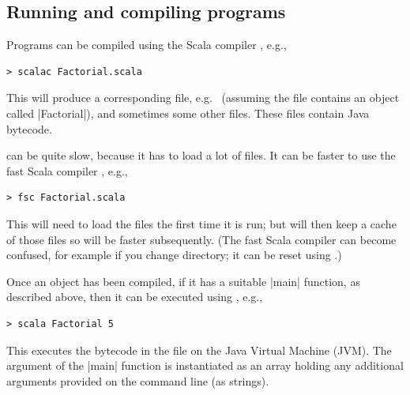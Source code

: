 \subsection{Running and compiling programs}


Programs can be compiled using the Scala compiler
, e.g., {\codecolour
\begin{verbatim}
> scalac Factorial.scala
\end{verbatim}
}%
\noindent This will produce a corresponding  file,
e.g.~ (assuming the file contains an object called
|Factorial|), and sometimes some other  files.  These files
contain Java bytecode.

 can be quite slow, because it has to load a lot of files.  It
can be faster to use the fast Scala compiler ,
e.g., {\codecolour
\begin{verbatim}
> fsc Factorial.scala
\end{verbatim}
}%
\noindent
This will need to load the files the first time it is run; but will then keep
a cache of those files so will be faster subsequently.  (The fast Scala
compiler can become confused, for example if you change directory; it can be
reset using .)


Once an object has been compiled, if it has a suitable |main| function, as
described above,
%
then it can be executed using , e.g.,
{\codecolour
\begin{verbatim}
> scala Factorial 5
\end{verbatim}
}%
\noindent
This executes the bytecode in the  file on the Java Virtual
Machine (JVM).  The argument of the |main| function is instantiated
as an array holding any additional arguments provided on the command line (as
strings).

